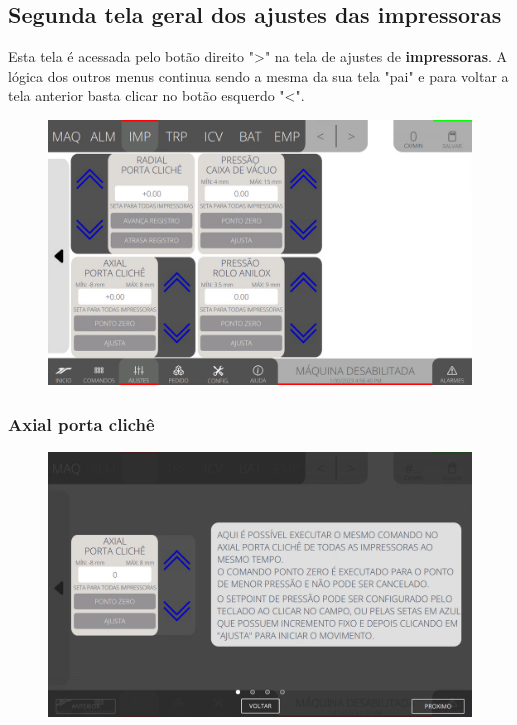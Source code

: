 \newpage
\thispagestyle{fancy}
\vspace*{40 pt}
\subsection{Segunda tela geral dos ajustes das impressoras} \label{sec:segundaTelaGeralAjustesImpressoras}
Esta tela é acessada pelo botão direito "\textgreater" na tela de ajustes de \textbf{impressoras}. A lógica dos outros menus continua sendo a mesma da sua tela "pai" e para voltar a tela anterior basta clicar no botão esquerdo "\textless{}".
\vspace*{\fill}
\begin{figure}[h]
    \centering
    \includegraphics[width=480 px,height=300 px]{src/imagesICV/04-printters/01-printters/settings/e-Tela-Principal-2.png}
\end{figure}
\vspace*{\fill}

\newpage
\thispagestyle{fancy}
\vspace*{40 pt}
\subsubsection{\small{Axial porta clichê}}
\vspace*{\fill}
\begin{figure}[h]
    \centering
    \includegraphics[width=576 px,height=360 px]{src/imagesICV/04-printters/01-printters/settings/10.png}
\end{figure}
\vspace*{\fill}

